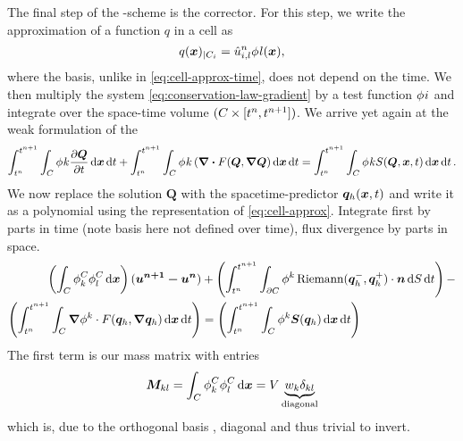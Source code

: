 The final step of the \aderdg{}-scheme is the corrector.
For this step, we write the approximation of a function $q$ in a cell as
\begin{equation}
  \label{eq:cell-approx-space}
  q(\bm{x})_{|\cell[i]} = \hat{u}^n_{i,l} \sbasis{l}(\bm{x}),
\end{equation}
where the basis, unlike in \cref{eq:cell-approx-time}, does not depend on the time.
We then multiply the system \cref{eq:conservation-law-gradient} by a test function $\stestfunction{i}$ and integrate over the space-time volume $(C_{} \times [t^n, t^{n+1}])$.
We arrive yet again at the weak formulation of the \pde\
\begin{equation}
  \label{eq:weak-pde}
\intdt{\intdcell{
\stestfunction{k} \pdv{\Q}{t}
}}
+
\intdt{\intdcell{
    \stestfunction{k} \left( \div{F(\Q, \gradQ } \right)
}}
=
\intdt{\intdcell{
    \stestfunction{k} S(\Q, \bm{x}, t)
}}.
\end{equation}
We now replace the solution $\bm{Q}$ with the spacetime-predictor $\bm{q}_{h} (\bm{x},t)$ and write it as a polynomial using the representation of \cref{eq:cell-approx}.
Integrate first by parts in time (note basis here not defined over time), flux divergence by parts in space.
\newcommand{\massMatrixDef}{\intdcell{
  \stestfunction[\cell][k] \sbasis[\cell][l]
}}
\begin{align}
\begin{split}
\label{eq:corrector}
\left(
\massMatrixDef
\right)
(\bm{u^{n+1} - u^{n}})
&+
\left(\intdt{\intdcellb{
      \stestfunction[k] \Riemann(\stpredictor^-, \stpredictor^+) \cdot \normal
}}\right)
-\\
\left(\intdt{\intdcell{
    \gradient{\stestfunction[k]} \cdot  \flux(\stpredictor, \gradient{\stpredictor}) %
}}\right)
&=
\left(\intdt{\intdcell{
      \stestfunction[k] \source(\stpredictor)
}}\right)
\end{split}
\end{align}
The first term is our mass matrix with entries
\newcommand{\massMatrix}[1][]{\bm{M}_{#1}}
\begin{equation}
  \label{eq:mass-matrix}
  \massMatrix[kl] = \massMatrixDef = \volume \underbrace{\quadWeight[k] \delta_{kl}}_{\text{diagonal}}
\end{equation}
which is, due to the orthogonal basis , diagonal and thus trivial to invert.
\newcommand{\basisSize}{(N+1)^d - 1}
